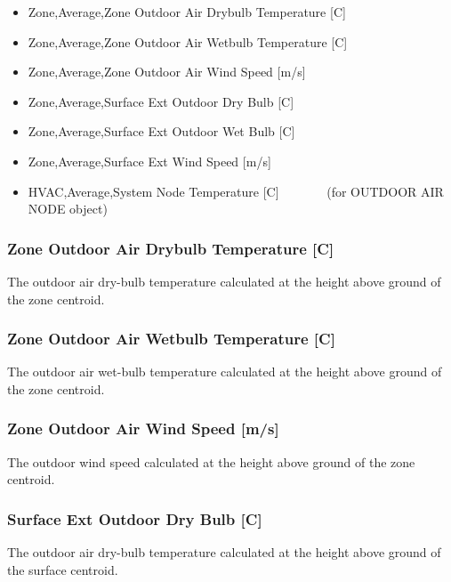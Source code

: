 \begin{itemize}
\item
  Zone,Average,Zone Outdoor Air Drybulb Temperature {[}C{]}
\item
  Zone,Average,Zone Outdoor Air Wetbulb Temperature {[}C{]}
\item
  Zone,Average,Zone Outdoor Air Wind Speed {[}m/s{]}
\item
  Zone,Average,Surface Ext Outdoor Dry Bulb {[}C{]}
\item
  Zone,Average,Surface Ext Outdoor Wet Bulb {[}C{]}
\item
  Zone,Average,Surface Ext Wind Speed {[}m/s{]}
\item
  HVAC,Average,System Node Temperature {[}C{]}~~~~~~~ (for OUTDOOR AIR NODE object)
\end{itemize}

\subsubsection{Zone Outdoor Air Drybulb Temperature {[}C{]}}\label{zone-outdoor-air-drybulb-temperature-c}

The outdoor air dry-bulb temperature calculated at the height above ground of the zone centroid.

\subsubsection{Zone Outdoor Air Wetbulb Temperature {[}C{]}}\label{zone-outdoor-air-wetbulb-temperature-c}

The outdoor air wet-bulb temperature calculated at the height above ground of the zone centroid.

\subsubsection{Zone Outdoor Air Wind Speed {[}m/s{]}}\label{zone-outdoor-air-wind-speed-ms}

The outdoor wind speed calculated at the height above ground of the zone centroid.

\subsubsection{Surface Ext Outdoor Dry Bulb {[}C{]}}\label{surface-ext-outdoor-dry-bulb-c}

The outdoor air dry-bulb temperature calculated at the height above ground of the surface centroid.

